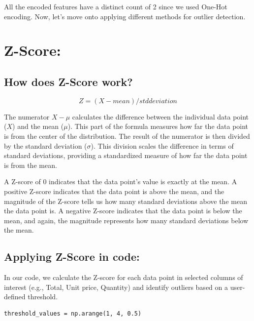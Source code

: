 All the encoded features have a distinct count of 2 since we used One-Hot encoding. Now, let’s move onto applying different methods for outlier detection.

\newpage
\section{Z-Score:}

\subsection{How does Z-Score work?}
\begin{equation}
Z = (X−mean)/std deviation
\end{equation}


The numerator $X - \mu$ calculates the difference between the individual data point ($X$) and the mean ($\mu$). This part of the formula measures how far the data point is from the center of the distribution. The result of the numerator is then divided by the standard deviation ($\sigma$). This division scales the difference in terms of standard deviations, providing a standardized measure of how far the data point is from the mean.

\newline 
A Z-score of 0 indicates that the data point's value is exactly at the mean. A positive Z-score indicates that the data point is above the mean, and the magnitude of the Z-score tells us how many standard deviations above the mean the data point is. A negative Z-score indicates that the data point is below the mean, and again, the magnitude represents how many standard deviations below the mean.


\subsection{Applying Z-Score in code:}
In our code, we calculate the Z-score for each data point in selected columns of interest (e.g., Total, Unit price, Quantity) and identify outliers based on a user-defined threshold.

\lstset{language=Python}
\begin{lstlisting}
threshold_values = np.arange(1, 4, 0.5)
\end{lstlisting}

